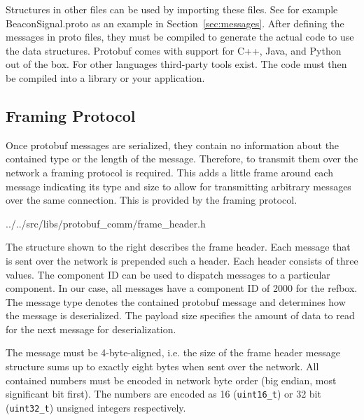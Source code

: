 \documentclass[a4paper]{article}
\newcommand{\refsec}[1]{Section~\ref{#1}}
\begin{document}
Structures in other files can be used by importing these files. See
for example BeaconSignal.proto as an example in
\refsec{sec:messages}.  After defining the messages in proto files,
they must be compiled to generate the actual code to use the data
structures. Protobuf comes with support for C++, Java, and Python
out of the box. For other languages third-party tools exist. The
code must then be compiled into a library or your application.

\subsection{Framing Protocol}

\begin{minipage}{\linewidth}
  \begin{minipage}[t]{.64\linewidth}
    \vspace{0pt}
Once protobuf messages are serialized, they contain no information
about the contained type or the length of the message. Therefore, to
transmit them over the network a framing protocol is required. This
adds a little frame around each message indicating its type and size
to allow for transmitting arbitrary messages over the same
connection. This is provided by the framing protocol.
  \end{minipage}
  \hspace{.01\linewidth}
  \begin{minipage}[t]{.34\linewidth}
    \vspace{0pt}

{../../src/libs/protobuf_comm/frame_header.h}
  \end{minipage}
\end{minipage}

\smallskip

The structure shown to the right describes the frame header. Each
message that is sent over the network is prepended such a header. Each
header consists of three values. The component ID can be used to
dispatch messages to a particular component. In our case, all messages
have a component ID of 2000 for the refbox. The message type denotes
the contained protobuf message and determines how the message is
deserialized. The payload size specifies the amount of data to read
for the next message for deserialization.

The message must be 4-byte-aligned, i.e. the size of the frame header
message structure sums up to exactly eight bytes when sent over the
network. All contained numbers must be encoded in network byte order
(big endian, most significant bit first). The numbers are encoded as
16 (\texttt{uint16\_t}) or 32 bit (\texttt{uint32\_t}) unsigned
integers respectively.
\end{document}
